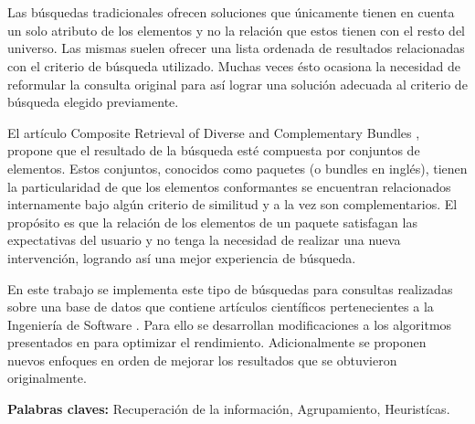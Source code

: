 \chapter*{\runtitulo}

\noindent Las búsquedas tradicionales ofrecen soluciones que únicamente tienen en cuenta un solo atributo de los elementos y no la relación que estos tienen con el resto del universo. Las mismas suelen ofrecer una lista ordenada de resultados relacionadas con el criterio de búsqueda utilizado. Muchas veces ésto ocasiona la necesidad de reformular la consulta original para así lograr una solución adecuada al criterio de búsqueda elegido previamente.

El artículo Composite Retrieval of Diverse and Complementary Bundles \cite{compositeRetrival}, propone que el resultado de la búsqueda esté compuesta por conjuntos de elementos. Estos conjuntos, conocidos como paquetes (o bundles en inglés), tienen la particularidad de que los elementos conformantes se encuentran relacionados internamente bajo algún criterio de similitud y a la vez son complementarios. El propósito es que la relación de los elementos de un paquete satisfagan las expectativas del usuario y no tenga la necesidad de realizar una nueva intervención, logrando así una mejor experiencia de búsqueda.

En este trabajo se implementa este tipo de búsquedas para consultas realizadas sobre una base de datos que contiene artículos científicos pertenecientes a la Ingeniería de Software \cite{dataDrive}. Para ello se desarrollan modificaciones a los algoritmos presentados en \cite{compositeRetrival} para optimizar el rendimiento. Adicionalmente se proponen nuevos enfoques en orden de mejorar los resultados que se obtuvieron originalmente.

\bigskip


\noindent\textbf{Palabras claves:} Recuperación de la información, Agrupamiento, Heuristícas.